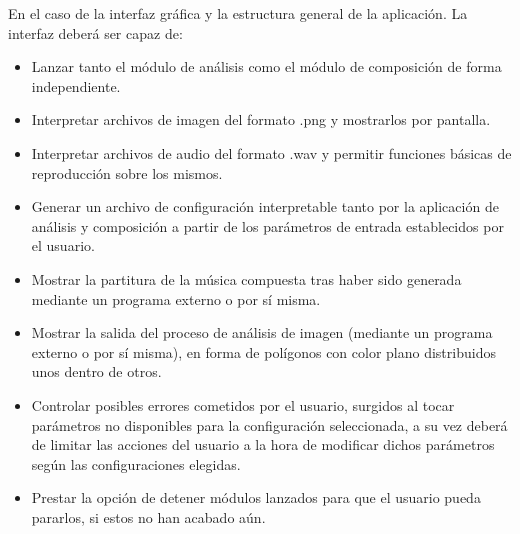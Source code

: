 	En el caso de la interfaz gráfica y la estructura general de la aplicación. \color{blue}La interfaz deberá ser capaz de:\color{black}
	
	 \begin{itemize}
		 \item Lanzar tanto el módulo de análisis como el módulo de composición de forma independiente.
		 \item Interpretar archivos de imagen del formato .png y mostrarlos por pantalla.
		 \item Interpretar archivos de audio del formato .wav y permitir funciones básicas de reproducción sobre los mismos.
		 \item Generar un archivo de configuración interpretable tanto por la aplicación de análisis y composición a partir de los parámetros de entrada establecidos por el usuario.
		 \item Mostrar la partitura de la música compuesta tras haber sido generada mediante un programa externo o por sí misma.
		 \item Mostrar la salida del proceso de análisis de imagen (mediante un programa externo o por sí misma), en forma de polígonos con color plano distribuidos unos dentro de otros.
		 \item Controlar posibles errores cometidos por el usuario, surgidos al tocar parámetros no disponibles para la configuración seleccionada, a su vez deberá de limitar las acciones del usuario a la hora de modificar dichos parámetros según las configuraciones elegidas.
		 \item Prestar la opción de detener módulos lanzados para que el usuario pueda pararlos, si estos no han acabado aún.
	 \end{itemize}
	 
